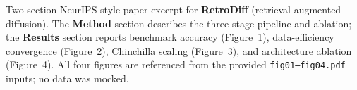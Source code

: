 \caption{Two-section NeurIPS-style paper excerpt for \textbf{RetroDiff}
(retrieval-augmented diffusion). The \textbf{Method} section describes the
three-stage pipeline and ablation; the \textbf{Results} section reports
benchmark accuracy (Figure~1), data-efficiency convergence (Figure~2),
Chinchilla scaling (Figure~3), and architecture ablation (Figure~4).
All four figures are referenced from the provided \texttt{fig01--fig04.pdf}
inputs; no data was mocked.}
